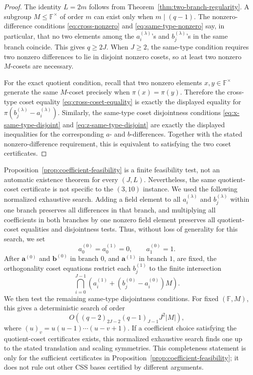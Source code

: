 \documentclass[11pt,a4paper]{article}
\newcommand{\F}{\mathbb{F}}
\theoremstyle{uprighttheorem}
\begin{document}
\begin{proof}
The identity \(L=2m\) follows from Theorem~\ref{thm:two-branch-regularity}.
A subgroup \(M\le\F^\times\) of order \(m\) can exist only when \(m\mid(q-1)\).
The nonzero-difference conditions \eqref{eq:cross-nonzero} and \eqref{eq:same-type-nonzero} say, in particular, that no two elements among the \(a_i^{(\lambda)}\)'s and \(b_j^{(\lambda)}\)'s in the same branch coincide.
This gives \(q\ge2J\).
When \(J\ge2\), the same-type condition requires two nonzero differences to lie in disjoint nonzero cosets, so at least two nonzero \(M\)-cosets are necessary.

For the exact quotient condition, recall that two nonzero elements \(x,y\in\F^\times\) generate the same \(M\)-coset precisely when \(\pi(x)=\pi(y)\).
Therefore the cross-type coset equality \eqref{eq:cross-coset-equality} is exactly the displayed equality for \(\pi(b_j^{(\lambda)}-a_i^{(\lambda)})\).
Similarly, the same-type coset disjointness conditions \eqref{eq:x-same-type-disjoint} and \eqref{eq:z-same-type-disjoint} are exactly the displayed inequalities for the corresponding \(a\)- and \(b\)-differences.
Together with the stated nonzero-difference requirement, this is equivalent to satisfying the two coset certificates.
\end{proof}

Proposition~\ref{prop:coefficient-feasibility} is a finite feasibility test, not an automatic existence theorem for every \((J,L)\).
Nevertheless, the same quotient-coset certificate is not specific to the \((3,10)\) instance.
We used the following normalized exhaustive search.
Adding a field element to all \(a_i^{(\lambda)}\) and \(b_j^{(\lambda)}\) within one branch preserves all differences in that branch, and multiplying all coefficients in both branches by one nonzero field element preserves all quotient-coset equalities and disjointness tests.
Thus, without loss of generality for this search, we set
\[
  a_0^{(0)}=a_0^{(1)}=0,\qquad a_1^{(0)}=1.
\]
After \(\bm a^{(0)}\) and \(\bm b^{(0)}\) in branch \(0\), and \(\bm a^{(1)}\) in branch \(1\), are fixed, the orthogonality coset equations restrict each \(b_j^{(1)}\) to the finite intersection
\[
  \bigcap_{i=0}^{J-1}
  \left(a_i^{(1)}+(b_j^{(0)}-a_i^{(0)})M\right).
\]
We then test the remaining same-type disjointness conditions.
For fixed \((\F,M)\), this gives a deterministic search of order
\[
  O\!\left((q-2)_{2J-2}(q-1)_{J-1}J^2|M|\right),
\]
where \((u)_v=u(u-1)\cdots(u-v+1)\).
If a coefficient choice satisfying the quotient-coset certificates exists, this normalized exhaustive search finds one up to the stated translation and scaling symmetries.
This completeness statement is only for the sufficient certificates in Proposition~\ref{prop:coefficient-feasibility}; it does not rule out other CSS bases certified by different arguments.
\end{document}
